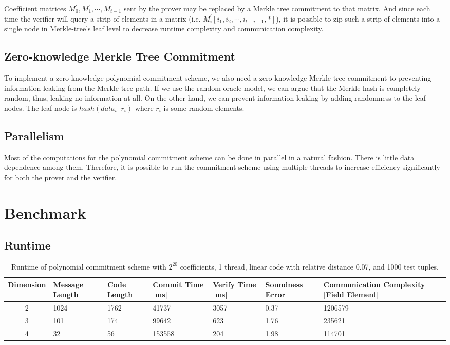 Coefficient matrices $M_0^\prime, M_1^\prime, \cdots, M_{t-1}^\prime$ sent by the prover may be replaced by a Merkle tree commitment to that matrix. And since each time the verifier will query a strip of elements in a matrix (i.e. $M_i^\prime[i_1, i_2, \cdots, i_{t-i-1}, *]$), it is possible to zip such a strip of elements into a single node in Merkle-tree's leaf level to decrease runtime complexity and communication complexity.

\subsection{Zero-knowledge Merkle Tree Commitment}

To implement a zero-knowledge polynomial commitment scheme, we also need a zero-knowledge Merkle tree commitment to preventing information-leaking from the Merkle tree path. If we use the random oracle model, we can argue that the Merkle hash is completely random, thus, leaking no information at all. On the other hand, we can prevent information leaking by adding randomness to the leaf nodes. The leaf node is $hash(data_i || r_i)$ where $r_i$ is some random elements. 

\subsection{Parallelism}

Most of the computations for the polynomial commitment scheme can be done in parallel in a natural fashion. There is little data dependence among them. Therefore, it is possible to run the commitment scheme using multiple threads to increase efficiency significantly for both the prover and the verifier.



\section{Benchmark}

\subsection{Runtime}


\begin{table}[h!]
\centering
\begin{tabular}{| c | m{4em}  | m{3em}  | m{3.5em} | m{2.5em} | m{5em} | m{7em} |} 
 \hline
 Dimension & Message Length & Code Length & Commit Time [ms] & Verify Time [ms] & Soundness Error & Communication Complexity [Field Element] \\ [0.5ex] 
 \hline\hline
 2 & 1024   & 1762 & 41737  & 3057  & 0.37 & 1206579 \\
 \hline
 3 & 101    & 174 & 99642  & 623  & 1.76 & 235621  \\
 \hline
 4 & 32     & 56 & 153558  & 204  & 1.98 & 114701   \\
 \hline
\end{tabular}
\caption{Runtime of polynomial commitment scheme with $2^{20}$ coefficients, 1 thread, linear code with relative distance 0.07, and 1000 test tuples.}
\label{table:benchmark-pc-1}
\end{table}


